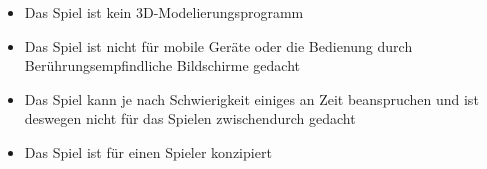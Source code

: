 \begin{itemize}



\item Das Spiel ist kein 3D-Modelierungsprogramm
\item Das Spiel ist nicht für mobile Geräte oder die Bedienung durch Berührungsempfindliche Bildschirme gedacht
\item Das Spiel kann je nach Schwierigkeit einiges an Zeit beanspruchen und ist deswegen nicht für das Spielen zwischendurch gedacht
\item Das Spiel ist für einen Spieler konzipiert

\end{itemize}